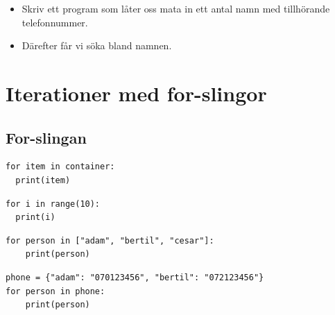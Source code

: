 \begin{frame}[fragile]
  \begin{example}
    \inputminted{python}{examples/isin-alt.py}
  \end{example}
\end{frame}

\begin{frame}[fragile]
  \begin{exercise}[search.py]
    \begin{itemize}
      \item Skriv ett program som låter oss mata in ett antal namn med 
        tillhörande telefonnummer.
      \item Därefter får vi söka bland namnen.
    \end{itemize}
  \end{exercise}
\end{frame}


\section{Iterationer med for-slingor}

\subsection{For-slingan}

\begin{frame}[fragile]
  \begin{verbatim}
for item in container:
  print(item)
  \end{verbatim}
\end{frame}

\begin{frame}[fragile]
  \begin{example}
    \begin{verbatim}
for i in range(10):
  print(i)
    \end{verbatim}
  \end{example}

  \begin{example}
    \begin{verbatim}
for person in ["adam", "bertil", "cesar"]:
    print(person)
    \end{verbatim}
  \end{example}

  \begin{example}
    \begin{verbatim}
phone = {"adam": "070123456", "bertil": "072123456"}
for person in phone:
    print(person)
    \end{verbatim}
  \end{example}
\end{frame}

